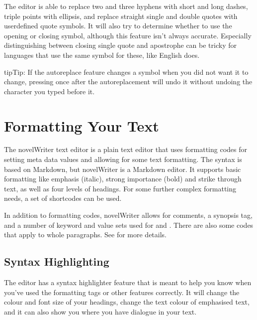 \documentclass[a4paper,11pt,english]{sphinxmanual}
\begin{document}
\sphinxAtStartPar
The editor is able to replace two and three hyphens with short and long dashes, triple points with
ellipsis, and replace straight single and double quotes with user\sphinxhyphen{}defined quote symbols. It will
also try to determine whether to use the opening or closing symbol, although this feature isn’t
always accurate. Especially distinguishing between closing single quote and apostrophe can be
tricky for languages that use the same symbol for these, like English does.

\begin{sphinxadmonition}{tip}{Tip:}
\sphinxAtStartPar
If the auto\sphinxhyphen{}replace feature changes a symbol when you did not want it to change, pressing
 once after the auto\sphinxhyphen{}replacement will undo it without undoing the character
you typed before it.
\end{sphinxadmonition}

\sphinxstepscope


\chapter{Formatting Your Text}
\label{\detokenize{usage_format:formatting-your-text}}\label{\detokenize{usage_format:a-fmt}}\label{\detokenize{usage_format::doc}}
\sphinxAtStartPar
The novelWriter text editor is a plain text editor that uses formatting codes for setting meta data
values and allowing for some text formatting. The syntax is based on Markdown, but novelWriter is
 a Markdown editor. It supports basic formatting like emphasis (italic), strong importance
(bold) and strike through text, as well as four levels of headings. For some further complex
formatting needs, a set of shortcodes can be used.

\sphinxAtStartPar
In addition to formatting codes, novelWriter allows for comments, a synopsis tag, and a number of
keyword and value sets used for {\hyperref[\detokenize{int_glossary:term-Tag}]{}} and {\hyperref[\detokenize{int_glossary:term-Reference}]{}}. There are also
some codes that apply to whole paragraphs. See {\hyperref[\detokenize{usage_format:a-fmt-text}]{}} for more details.


\section{Syntax Highlighting}
\label{\detokenize{usage_format:syntax-highlighting}}\label{\detokenize{usage_format:a-fmt-hlight}}
\sphinxAtStartPar
The editor has a syntax highlighter feature that is meant to help you know when you’ve used the
formatting tags or other features correctly. It will change the colour and font size of your
headings, change the text colour of emphasised text, and it can also show you where you have
dialogue in your text.
\end{document}
